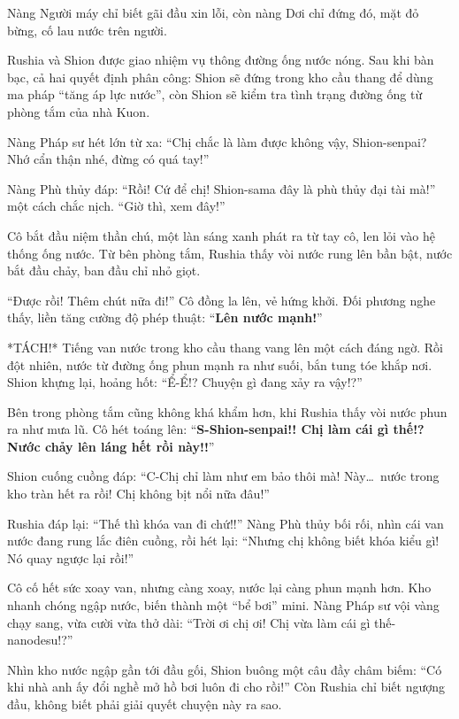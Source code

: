 \documentclass[../main.tex]{subfiles}
\begin{document}
Nàng Người máy chỉ biết gãi đầu xin lỗi, còn nàng Dơi chỉ đứng đó, mặt đỏ bừng, cố lau nước trên người.

\ct

Rushia và Shion được giao nhiệm vụ thông đường ống nước nóng. Sau khi bàn bạc, cả hai quyết định phân công: Shion sẽ đứng trong kho cầu thang để dùng ma pháp ``tăng áp lực nước'', còn Shion sẽ kiểm tra tình trạng đường ống từ phòng tắm của nhà Kuon.

Nàng Pháp sư hét lớn từ xa: ``Chị chắc là làm được không vậy, Shion-senpai? Nhớ cẩn thận nhé, đừng có quá tay!''

Nàng Phù thủy đáp: ``Rồi! Cứ để chị! Shion-sama đây là phù thủy đại tài mà!'' một cách chắc nịch. ``Giờ thì, xem đây!''

Cô bắt đầu niệm thần chú, một làn sáng xanh phát ra từ tay cô, len lỏi vào hệ thống ống nước. Từ bên phòng tắm, Rushia thấy vòi nước rung lên bần bật, nước bắt đầu chảy, ban đầu chỉ nhỏ giọt.

``Được rồi! Thêm chút nữa đi!'' Cô đồng la lên, vẻ hứng khởi. Đối phương nghe thấy, liền tăng cường độ phép thuật: ``\textbf{Lên nước mạnh!}''

*TÁCH!* Tiếng van nước trong kho cầu thang vang lên một cách đáng ngờ. Rồi đột nhiên, nước từ đường ống phun mạnh ra như suối, bắn tung tóe khắp nơi. Shion khựng lại, hoảng hốt: ``Ể-Ể!? Chuyện gì đang xảy ra vậy!?''

Bên trong phòng tắm cũng không khá khẩm hơn, khi Rushia thấy vòi nước phun ra như mưa lũ. Cô hét toáng lên: ``\textbf{S-Shion-senpai!! Chị làm cái gì thế!? Nước chảy lên láng hết rồi này!!}''

Shion cuống cuồng đáp: ``C-Chị chỉ làm như em bảo thôi mà! Này\dots\ nước trong kho tràn hết ra rồi! Chị không bịt nổi nữa đâu!''

Rushia đáp lại: ``Thế thì khóa van đi chứ!!'' Nàng Phù thủy bối rối, nhìn cái van nước đang rung lắc điên cuồng, rồi hét lại: ``Nhưng chị không biết khóa kiểu gì! Nó quay ngược lại rồi!''

Cô cố hết sức xoay van, nhưng càng xoay, nước lại càng phun mạnh hơn. Kho nhanh chóng ngập nước, biến thành một ``bể bơi'' mini. Nàng Pháp sư vội vàng chạy sang, vừa cười vừa thở dài: ``Trời ơi chị ơi! Chị vừa làm cái gì thế-nanodesu!?''

Nhìn kho nước ngập gần tới đầu gối, Shion buông một câu đầy châm biếm: ``Có khi nhà anh ấy đổi nghề mở hồ bơi luôn đi cho rồi!'' Còn Rushia chỉ biết ngượng đầu, không biết phải giải quyết chuyện này ra sao.
\end{document}
